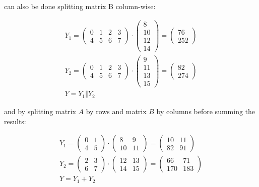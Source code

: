 \documentclass{article}
\begin{document}
can also be done splitting matrix B column-wise:

\begin{gather*}
  Y_1=\begin{pmatrix}
    0 & 1 & 2 & 3\\
    4 & 5 & 6 & 7
    \end{pmatrix}\cdot \begin{pmatrix}8\\10\\12\\14\end{pmatrix}
    =\begin{pmatrix}76\\252\end{pmatrix} \\
    Y_2=\begin{pmatrix}
      0 & 1 & 2 & 3\\
      4 & 5 & 6 & 7
      \end{pmatrix}\cdot \begin{pmatrix}9\\11\\13\\15\end{pmatrix}
      =\begin{pmatrix}82\\274\end{pmatrix} \\
      Y=Y_1 \mathbin\Vert Y_2
\end{gather*}

and by splitting matrix \(A\) by rows and matrix \(B\) by columns before summing the results:

\begin{gather*}
  Y_1=\begin{pmatrix}0 & 1\\4 & 5\end{pmatrix}\cdot \begin{pmatrix}8 & 9\\10 & 11\end{pmatrix}
  =\begin{pmatrix}10 & 11\\82 & 91\end{pmatrix} \\
  Y_2=\begin{pmatrix}2 & 3\\6 & 7\end{pmatrix}\cdot \begin{pmatrix}12 & 13\\14 & 15\end{pmatrix}
  =\begin{pmatrix}66 & 71\\170 & 183\end{pmatrix} \\
  Y=Y_1+Y_2
\end{gather*}
\end{document}
